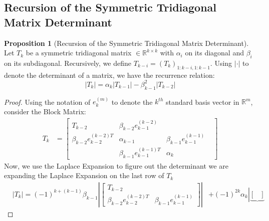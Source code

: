 \documentclass[]{article}
\theoremstyle{definition}
\newtheorem{prop}{Proposition}[section]  %
\begin{document}
\begin{appendices}
        \subsection{Recursion of the Symmetric Tridiagonal Matrix Determinant}
            \begin{prop}[Recursion of the Symmetric Tridiagonal Matrix Determinant]\label{prop:Recurrence_of_the_Symmetric_Tridiagonal_Matrix_Determinant}
                Let $T_k$ be a symmetric tridiagonal matrix $\in \mathbb{R}^{k\times k}$ with $\alpha_i$ on its diagonal and $\beta_i$ on its subdiagonal. Recursively, we define $T_{k - i} = (T_{k})_{1:k - i, 1:k - 1}$. Using $|\cdot|$ to denote the determinant of a matrix, we have the recurrence relation: 
                $$
                    |T_k| = \alpha_k|T_{k - 1}| - \beta_{k - 1}^2|T_{k - 2}|
                $$
            \end{prop}
            \begin{proof}
                Using the notation of $e_{k}^{(m)}$ to denote the $k^{th}$ standard basis vector in $\mathbb{R}^m$, consider the Block Matrix: 
                \begin{align}
                    T_k &= \begin{bmatrix}
                        T_{k - 2} & \beta_{k - 2}e_{k - 1}^{(k - 2)} & 
                        \\
                        \beta_{k - 2}e_{k - 2}^{(k - 2)T} & \alpha_{k - 1}  & \beta_{k - 1}e_{k - 1}^{(k - 1)}
                        \\
                        & \beta_{k - 1}e_{k - 1}^{(k - 1)T} & \alpha_k&
                    \end{bmatrix}
                \end{align}
                Now, we use the Laplace Expansion to figure out the determinant we are expanding the Laplace Expansion on the last row of $T_k$
                \begin{align}
                    &|T_k| = (-1)^{k+(k - 1)}\beta_{k - 1} \left|\begin{bmatrix}
                        T_{k - 2} & 
                        \\
                        \beta_{k - 2}e^{(k - 2)T}_{k - 2} & \beta_{k - 1}e_{k - 1}^{(k - 1)}
                    \end{bmatrix}\right|&
                     + 
                    (-1)^{2k} \alpha_k
                    \left|
                        \underbrace{\begin{bmatrix}

\end{bmatrix}}
\end{align}
\end{proof}
\end{appendices}
\end{document}
